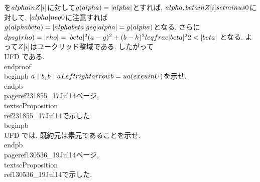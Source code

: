  を$\\alpha\\in\\Z[i]$に対して$g(\\alpha)=|\\alpha|$とすれば, $\\alpha,
 \\beta\\in\\Z[i]\\setminus\\{0\\}$に対して, $|\\alpha|\\neq 0$に注意すれば
 $g(\\alpha\\beta)=|\\alpha\\beta|\\geq |\\alpha|=g(\\alpha)$となる. さらに
 $\\dps
 g(\\rho)=|\\rho|=|\\beta|^{2}\\{(a-g)^{2}+(b-h)^{2}\\}\\leq\\frac{|\\beta|^{2}}{2}<|\\beta|$
 となる. よって$\\Z[i]$はユークリッド整域である. したがって\\UFD である.
\\end{proof}
\\begin{pb}
 $a~|~b, b~|~a\\Leftrightarrow b=ua(\\exe u\\in U)$を示せ.
\\end{pb}
 \\pageref{231855_17Jul14}ページ,
 \\textsc{Proposition}~\\ref{231855_17Jul14}で示した.
\\begin{pb}
 \\UFD では, 既約元は素元であることを示せ.
\\end{pb}
\\pageref{130536_19Jul14}ページ,
\\textsc{Proposition}~\\ref{130536_19Jul14}で示した.
